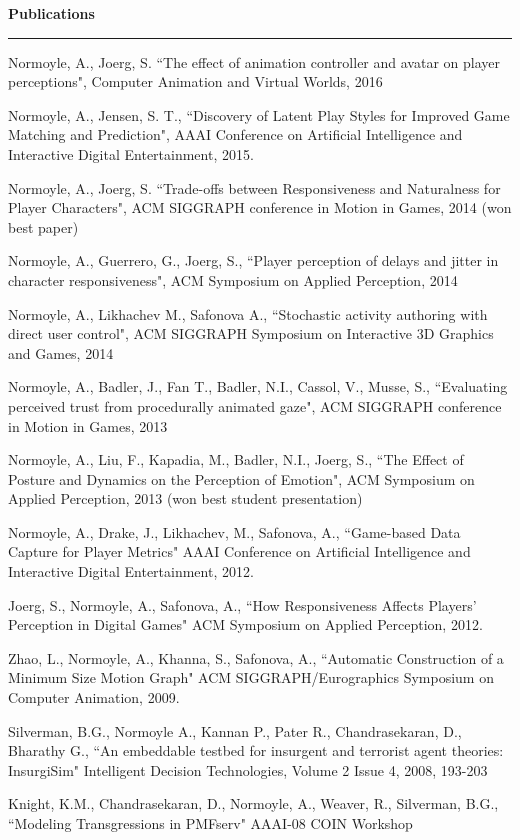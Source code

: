 {\Large {\bf  Publications}}
\vspace{0.1cm}
\hrule
\medskip

Normoyle, A., Joerg, S. ``The effect of animation controller and avatar on player perceptions", 
Computer Animation and Virtual Worlds, 2016 

Normoyle, A., Jensen, S. T., ``Discovery of Latent Play Styles for Improved Game Matching and Prediction", 
AAAI Conference on Artificial Intelligence and Interactive Digital Entertainment, 2015.

Normoyle, A., Joerg, S. ``Trade-offs between Responsiveness and Naturalness for Player Characters", 
ACM SIGGRAPH conference in Motion in Games, 2014 (won best paper)

Normoyle, A., Guerrero, G., Joerg, S., ``Player perception of delays and jitter in character responsiveness", 
ACM Symposium on Applied Perception, 2014 

Normoyle, A., Likhachev M., Safonova A., ``Stochastic activity authoring with direct user control", 
ACM SIGGRAPH Symposium on Interactive 3D Graphics and Games, 2014 

Normoyle, A., Badler, J., Fan T., Badler, N.I., Cassol, V., Musse, S., ``Evaluating perceived trust from procedurally animated gaze", ACM SIGGRAPH conference in Motion in Games, 2013 

Normoyle, A., Liu, F., Kapadia, M., Badler, N.I., Joerg, S., ``The Effect of Posture and Dynamics on the Perception of Emotion", ACM Symposium on Applied Perception, 2013 (won best student presentation)

Normoyle, A., Drake, J., Likhachev, M., Safonova, A., ``Game-based Data Capture for Player Metrics" 
AAAI Conference on Artificial Intelligence and Interactive Digital Entertainment, 2012.

Joerg, S., Normoyle, A., Safonova, A., ``How Responsiveness Affects Players' Perception in Digital Games" 
ACM Symposium on Applied Perception, 2012.

Zhao, L., Normoyle, A., Khanna, S., Safonova, A., ``Automatic Construction of a Minimum Size Motion Graph" ACM SIGGRAPH/Eurographics Symposium on Computer Animation, 2009.

Silverman, B.G., Normoyle A., Kannan P., Pater R., Chandrasekaran, D., Bharathy G., ``An embeddable testbed for insurgent and terrorist agent theories: InsurgiSim" Intelligent Decision Technologies, Volume 2 Issue 4, 2008, 193-203

Knight, K.M., Chandrasekaran, D., Normoyle, A., Weaver, R., Silverman, B.G., ``Modeling Transgressions in PMFserv" AAAI-08 COIN Workshop

